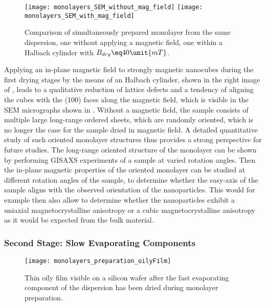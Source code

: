 \documentclass[\main/dresen_thesis.tex]{subfiles}
\begin{document}
    \begin{figure}[tb]
      \centering
      \texttt{[image: monolayers\_SEM\_without\_mag\_field]}
      \texttt{[image: monolayers\_SEM\_with\_mag\_field]}
      \caption{\label{fig:monolayers:preparation:dryingConditions:magneticField}Comparison of simultaneously prepared monolayer from the same dispersion, one without applying a magnetic field, one within a Halbach cylinder with $B_{dry} \eq 40 \unit{mT}$.}
    \end{figure}
    Applying an in-plane magnetic field to strongly magnetic nanocubes during the first drying stages by the means of an Halbach cylinder, shown in the right image of , leads to a qualitative reduction of lattice defects and a tendency of aligning the cubes with the (100) faces along the magnetic field, which is visible in the SEM micrographs shown in .
    Without a magnetic field, the sample consists of multiple large long-range ordered sheets, which are randomly oriented, which is no longer the case for the sample dried in magnetic field.
    A detailed quantitative study of such oriented monolayer structures thus provides a strong perspective for future studies.
    The long-range oriented structure of the monolayer can be shown by performing GISAXS experiments of a sample at varied rotation angles.
    Then the in-plane magnetic properties of the oriented monolayer can be studied at different rotation angles of the sample, to determine whether the easy-axis of the sample aligns with the observed orientation of the nanoparticles.
    This would for example then also allow to determine whether the nanoparticles exhibit a uniaxial magnetocrystalline anisotropy or a cubic magnetocrystalline anisotropy as it would be expected from the bulk material.

  \subsubsection{Second Stage: Slow Evaporating Components}
    \begin{figure}[tb]
      \centering
      \texttt{[image: monolayers\_preparation\_oilyFilm]}
      \caption{\label{fig:monolayers:preparation:dryingConditions:oilyFilm}Thin oily film visible on a silicon wafer after the fast evaporating component of the dispersion has been dried during monolayer preparation.}
    \end{figure}
\end{document}
